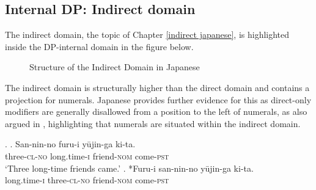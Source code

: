 \documentclass [output=book,colorlinks,citecolor=brown]{langscibook}
\begin{document}
\newpage

\subsection{Internal DP: Indirect domain}

The indirect domain, the topic of Chapter \ref{indirect japanese}, is highlighted inside the DP-internal domain in the figure below. %

\begin{figure}[H]
\centering


 \caption{Structure of the Indirect Domain in Japanese}
 \label{fig:Structure of the Indirect Domain in Japanese1}
\end{figure}


The indirect domain is structurally higher than the direct domain and contains a projection for numerals. Japanese provides further evidence for this as direct-only modifiers are generally disallowed from a position to the left of numerals, as also argued in \citet{ayano:2010:revisiting, watanabe:2017:attributive}, highlighting that numerals are situated within the indirect domain. %

\newpage

\ex. \ag. San-nin-no furu-i yūjin-ga ki-ta.\\
three-\textsc{cl-no} long.time-\textsc{i} friend-\textsc{nom} come-\textsc{pst}\\
`Three long-time friends came.' \hfill \citep[106]{ayano:2010:revisiting}
\bg. *Furu-i san-nin-no yūjin-ga ki-ta.\\
long.time-\textsc{i} three-\textsc{cl-no} friend-\textsc{nom} come-\textsc{pst}\\
\end{document}
